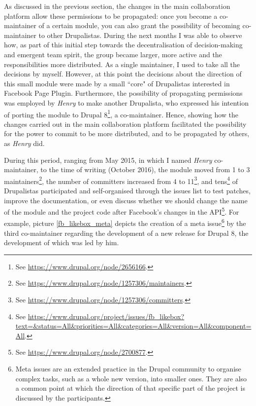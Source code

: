 As discussed in the previous section, the changes in the main collaboration platform allow these permissions to be propagated: once you become a co-maintainer of a certain module, you can also grant the possibility of becoming co-maintainer to other Drupalistas. During the next months I was able to observe how, as part of this initial step towards the decentralisation of decision-making and emergent team spirit, the group became larger, more active and the responsibilities more distributed. As a single maintainer, I used to take all the decisions by myself. However, at this point the decisions about the direction of this small module were made by a small ``core" of Drupalistas interested in Facebook Page Plugin. Furthermore, the possibility of propagating permissions was employed by \textit{Henry} to make another Drupalista, who expressed his intention of porting the module to Drupal 8\footnote{See \url{https://www.drupal.org/node/2656166}.}, a co-maintainer. Hence, showing how the changes carried out in the main collaboration platform facilitated the possibility for the power to commit to be more distributed, and to be propagated by others, as \textit{Henry} did.

During this period, ranging from May 2015, in which I named \textit{Henry} co-maintainer, to the time of writing (October 2016), the module moved from 1 to 3 maintainers\footnote{See \url{https://www.drupal.org/node/1257306/maintainers}.}, the number of committers increased from 4 to 11\footnote{See \url{https://www.drupal.org/node/1257306/committers}.}, and tens\footnote{See \url{https://www.drupal.org/project/issues/fb_likebox?text=&status=All&priorities=All&categories=All&version=All&component=All}.} of Drupalistas participated and self-organised through the issues list to test patches, improve the documentation, or even discuss whether we should change the name of the module and the project code after Facebook's changes in the API\footnote{See \url{https://www.drupal.org/node/2700877}.}. For example, picture \ref{fb_likebox_meta} depicts the creation of a meta issue\footnote{Meta issues are an extended practice in the Drupal community to organise complex tasks, such as a whole new version, into smaller ones. They are also a common point at which the direction of that specific part of the project is discussed by the participants.} by the third co-maintainer regarding the development of a new release for Drupal 8, the development of which was led by him.

